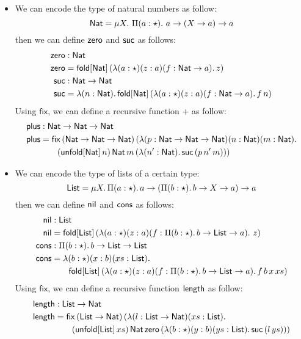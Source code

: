 \documentclass[oneside,a4paper]{article}
\theoremstyle{break}
\newcommand{\fold}[2]{\mathsf{fold}[#1]\,#2}
\newcommand{\unfold}[2]{\mathsf{unfold}[#1]\,#2}
\begin{document}
\begin{itemize}

\item We can encode the type of natural numbers as follow:
  \[
  \mathsf{Nat} = \mu X.\ \Pi(a : \star).\ a \rightarrow (X \rightarrow a)
  \rightarrow a
\]
then we can define $\mathsf{zero}$ and $\mathsf{suc}$ as follows:
\begin{align*}
  \zero &: \Nat \\
  \zero &= \fold{\Nat}{(\lambda (a : \star) (z : a) (f : \Nat \rightarrow a).\,z)}\\
  \suc &: \Nat \rightarrow \Nat\\
  \suc &= \lambda (n : \Nat).\,\fold{\Nat}{(\lambda (a : \star) (z : a) (f : \Nat \rightarrow a).\,f\,n)}
\end{align*}
Using $\mathsf{fix}$, we can define a recursive function $\plus$ as
follow:
\begin{align*}
  \plus &:\PlFunc\\
  \plus &=\mathsf{fix}\,(\PlFunc)\,(\lambda(p : \PlFunc)(n : \Nat)(m : \Nat).\\
        &\qquad (\unfold{\Nat}{n})\,\Nat\,m\,(\lambda (n^{\prime} : \Nat).\,\suc\,(p\,n^{\prime}\,m)))
\end{align*}
\item We can encode the type of lists of a certain type:
  \[
  \mathsf{List} = \mu X.\,\Pi(a : \star).\,a \rightarrow (\Pi (b : \star).\,b
  \rightarrow X \rightarrow a) \rightarrow a
\]
then we can define $\mathsf{nil}$ and $\mathsf{cons}$ as follows:
\begin{align*}
  \nil &: \List\\
  \nil &= \fold{\List}{(\lambda (a : \star) (z : a) (f : \Pi (b : \star).\,b \rightarrow \List \rightarrow a).\ z)}\\
  \cons &: \Pi (b : \star).\,b \rightarrow \List \rightarrow \List\\
  \cons &= \lambda(b : \star)(x : b)(xs : \List).\\
       &\qquad \fold{\List}{(\lambda(a : \star)(z : a)(f : \Pi (b : \star).\,b\rightarrow \List \rightarrow a).\,f\,b\,x\,xs)}
\end{align*}
Using $\mathsf{fix}$, we can define a recursive function $\mathsf{length}$ as
follow:
\begin{align*}
  \length &: \List \rightarrow \Nat\\
  \length &= \mathsf{fix}\,(\List \rightarrow \Nat)\,(\lambda(l : \List
            \rightarrow \Nat)(xs : \List).\\
          &\qquad (\unfold{\List}{xs})\,\Nat\,\zero\,(\lambda(b : \star)(y : b)(ys : \List).\,\suc\,(l\,ys)))
\end{align*}
\end{itemize}
\end{document}
